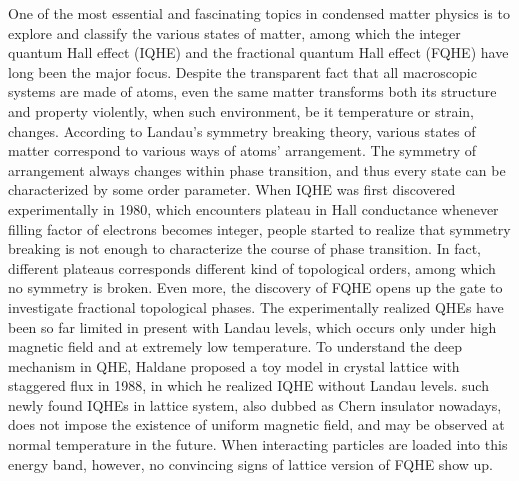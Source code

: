 \begin{englishabstract}
One of the most essential and fascinating topics in condensed matter physics is to explore and classify the various states of matter, among which the integer quantum Hall effect (IQHE) and the fractional quantum Hall effect (FQHE) have long been the major focus. Despite the transparent fact that all macroscopic systems are made of atoms, even the same matter transforms both its structure and property violently, when such environment, be it temperature or strain, changes. According to Landau's symmetry breaking theory, various states of matter correspond to various ways of atoms' arrangement. The symmetry of arrangement always changes within phase transition, and thus every state can be characterized by some order parameter. When IQHE was first discovered experimentally in 1980, which encounters plateau in Hall conductance whenever filling factor of electrons becomes integer, people started to realize that symmetry breaking is not enough to characterize the course of phase transition. In fact, different plateaus corresponds different kind of topological orders, among which no symmetry is broken. Even more, the discovery of FQHE opens up the gate to investigate fractional topological phases. The experimentally realized QHEs have been so far limited in present with Landau levels, which occurs only under high magnetic field and at extremely low temperature. To understand the deep mechanism in QHE, Haldane proposed a toy model in crystal lattice with staggered flux in 1988, in which he realized IQHE without Landau levels. such newly found IQHEs in lattice system, also dubbed as Chern insulator nowadays, does not impose the existence of uniform magnetic field, and may be observed at normal temperature in the future. When interacting particles are loaded into this energy band, however, no convincing signs of lattice version of FQHE show up.


\end{englishabstract}
